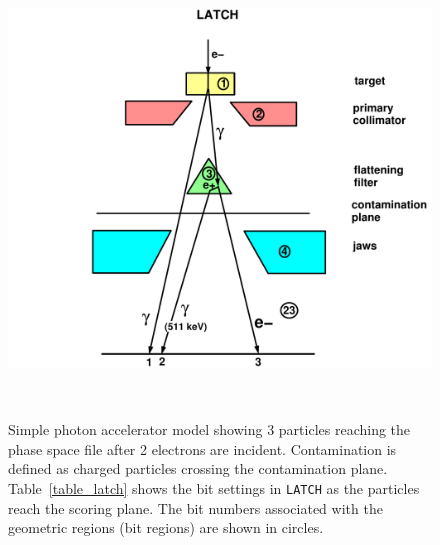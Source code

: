 \documentclass[12pt,twoside]{article}
\begin{document}
\begin{figure}[H]
\vspace*{-0.3cm}
\begin{center}
\leavevmode
\mbox{}\hspace{0cm}
\includegraphics[height=12cm]{figures/latch}
\caption[Example of LATCH settings.]
{Simple photon accelerator model showing 3 particles reaching
the phase space file after 2 electrons are incident.  Contamination is
defined as charged particles crossing the contamination plane.
Table~\ref{table_latch} shows the bit settings in {\tt LATCH} as the particles
reach the scoring plane. The bit numbers associated with the geometric regions
(bit regions) are shown in circles.}
\label{fig_latch}
\end{center}
\end{figure}
\end{document}
